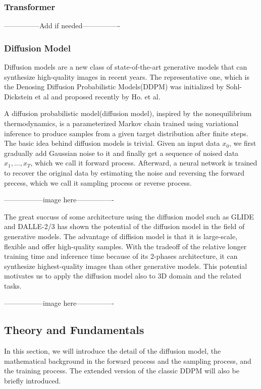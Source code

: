 \documentclass[12pt,DIV14,BCOR12mm,a4paper,footinclude=false,headinclude,parskip=half-,twoside,openright,cleardoublepage=empty,toc=index,bibliography=totoc,listof=totoc]{scrreprt}
\numberwithin{equation}{chapter}
\begin{document}
\subsubsection{Transformer}
---------------Add if needed----------------

\subsubsection{Diffusion Model}
Diffusion models are a new class of state-of-the-art generative models that can synthesize high-quality images in recent years. The representative one, 
which is the Denosing Diffusion Probabilistic Models(DDPM) was initialized by Sohl-Dickstein et al\cite{sohldickstein2015deep} 
and proposed recently by Ho. et al\cite{ho2020denoising}. 

A diffusion probabilistic model(diffusion model), inspired by the nonequilibrium thermodynamics,
is a parameterized Markov chain trained using variational inference to produce samples from a given target distribution after finite steps.
The basic idea behind diffusion models is trivial. Given an input data $x_{0}$, we first gradually add Gaussian noise to it 
and finally get a sequence of noised data $x_{1},...,x_{T}$, which we call it forward process. Afterward, 
a neural network is trained to recover the original data by estimating the noise and reversing the forward precess, which we call it sampling process or reverse process.

-----------------image here----------------

The great succuss of some architecture using the diffusion model such as GLIDE\cite{nichol2022glide} 
and DALLE-2/3\cite{ramesh2022hierarchical} has shown the potential of the diffusion model in the field of generative models.
The advantage of diffision model is that it is large-scale, flexible and offer high-quality samples. 
With the tradeoff of the relative longer training time and inference time because of its 2-phases architecture, 
it can synthesize highest-quality images than other generative models. This potential motivates us to apply the diffusion model also to 3D domain and the related tasks.

-----------------image here----------------

\subsection{Theory and Fundamentals}
In this section, we will introduce the detail of the diffusion model, the mathematical background in the forward process and the sampling process, and the training process.
The extended version of the classic DDPM will also be briefly introduced.
\end{document}

